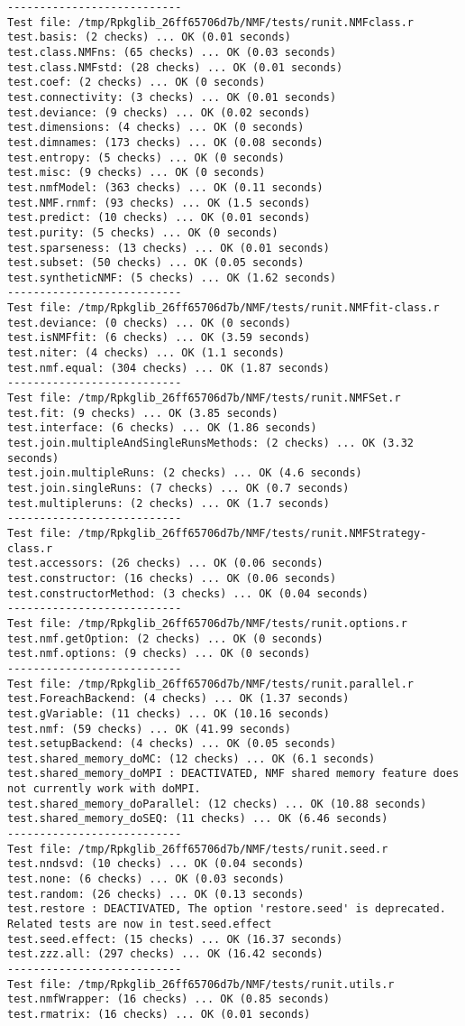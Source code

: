 \documentclass[10pt]{article}\usepackage[]{graphicx}\usepackage[]{color}
\begin{document}
\begin{verbatim}
--------------------------- 
Test file: /tmp/Rpkglib_26ff65706d7b/NMF/tests/runit.NMFclass.r 
test.basis: (2 checks) ... OK (0.01 seconds)
test.class.NMFns: (65 checks) ... OK (0.03 seconds)
test.class.NMFstd: (28 checks) ... OK (0.01 seconds)
test.coef: (2 checks) ... OK (0 seconds)
test.connectivity: (3 checks) ... OK (0.01 seconds)
test.deviance: (9 checks) ... OK (0.02 seconds)
test.dimensions: (4 checks) ... OK (0 seconds)
test.dimnames: (173 checks) ... OK (0.08 seconds)
test.entropy: (5 checks) ... OK (0 seconds)
test.misc: (9 checks) ... OK (0 seconds)
test.nmfModel: (363 checks) ... OK (0.11 seconds)
test.NMF.rnmf: (93 checks) ... OK (1.5 seconds)
test.predict: (10 checks) ... OK (0.01 seconds)
test.purity: (5 checks) ... OK (0 seconds)
test.sparseness: (13 checks) ... OK (0.01 seconds)
test.subset: (50 checks) ... OK (0.05 seconds)
test.syntheticNMF: (5 checks) ... OK (1.62 seconds)
--------------------------- 
Test file: /tmp/Rpkglib_26ff65706d7b/NMF/tests/runit.NMFfit-class.r 
test.deviance: (0 checks) ... OK (0 seconds)
test.isNMFfit: (6 checks) ... OK (3.59 seconds)
test.niter: (4 checks) ... OK (1.1 seconds)
test.nmf.equal: (304 checks) ... OK (1.87 seconds)
--------------------------- 
Test file: /tmp/Rpkglib_26ff65706d7b/NMF/tests/runit.NMFSet.r 
test.fit: (9 checks) ... OK (3.85 seconds)
test.interface: (6 checks) ... OK (1.86 seconds)
test.join.multipleAndSingleRunsMethods: (2 checks) ... OK (3.32 seconds)
test.join.multipleRuns: (2 checks) ... OK (4.6 seconds)
test.join.singleRuns: (7 checks) ... OK (0.7 seconds)
test.multipleruns: (2 checks) ... OK (1.7 seconds)
--------------------------- 
Test file: /tmp/Rpkglib_26ff65706d7b/NMF/tests/runit.NMFStrategy-class.r 
test.accessors: (26 checks) ... OK (0.06 seconds)
test.constructor: (16 checks) ... OK (0.06 seconds)
test.constructorMethod: (3 checks) ... OK (0.04 seconds)
--------------------------- 
Test file: /tmp/Rpkglib_26ff65706d7b/NMF/tests/runit.options.r 
test.nmf.getOption: (2 checks) ... OK (0 seconds)
test.nmf.options: (9 checks) ... OK (0 seconds)
--------------------------- 
Test file: /tmp/Rpkglib_26ff65706d7b/NMF/tests/runit.parallel.r 
test.ForeachBackend: (4 checks) ... OK (1.37 seconds)
test.gVariable: (11 checks) ... OK (10.16 seconds)
test.nmf: (59 checks) ... OK (41.99 seconds)
test.setupBackend: (4 checks) ... OK (0.05 seconds)
test.shared_memory_doMC: (12 checks) ... OK (6.1 seconds)
test.shared_memory_doMPI : DEACTIVATED, NMF shared memory feature does not currently work with doMPI.
test.shared_memory_doParallel: (12 checks) ... OK (10.88 seconds)
test.shared_memory_doSEQ: (11 checks) ... OK (6.46 seconds)
--------------------------- 
Test file: /tmp/Rpkglib_26ff65706d7b/NMF/tests/runit.seed.r 
test.nndsvd: (10 checks) ... OK (0.04 seconds)
test.none: (6 checks) ... OK (0.03 seconds)
test.random: (26 checks) ... OK (0.13 seconds)
test.restore : DEACTIVATED, The option 'restore.seed' is deprecated. Related tests are now in test.seed.effect
test.seed.effect: (15 checks) ... OK (16.37 seconds)
test.zzz.all: (297 checks) ... OK (16.42 seconds)
--------------------------- 
Test file: /tmp/Rpkglib_26ff65706d7b/NMF/tests/runit.utils.r 
test.nmfWrapper: (16 checks) ... OK (0.85 seconds)
test.rmatrix: (16 checks) ... OK (0.01 seconds)


\end{verbatim}
\end{document}
